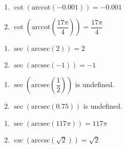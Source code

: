 \begin{multicols}{2}

\begin{enumerate}

\setcounter{enumi}{\value{HW}}

\item $\cot\left(\text{arccot}\left(-0.001\right)\right) = -0.001$ 
\item $\cot\left(\text{arccot}\left( \dfrac{17\pi}{4} \right)\right) = \dfrac{17\pi}{4}$

\setcounter{HW}{\value{enumi}}

\end{enumerate}

\end{multicols}

\begin{multicols}{2}

\begin{enumerate}

\setcounter{enumi}{\value{HW}}

\item $\sec\left(\text{arcsec}\left(2\right)\right) = 2$
\item $\sec\left(\text{arcsec}\left(-1\right)\right) = -1$

\setcounter{HW}{\value{enumi}}

\end{enumerate}

\end{multicols}

\begin{multicols}{2}

\begin{enumerate}

\setcounter{enumi}{\value{HW}}

\item $\sec\left(\text{arcsec}\left(\dfrac{1}{2}\right)\right)$ is undefined.
\item $\sec\left(\text{arcsec}\left(0.75\right)\right)$ is undefined. 

\setcounter{HW}{\value{enumi}}

\end{enumerate}

\end{multicols}

\begin{multicols}{2}

\begin{enumerate}

\setcounter{enumi}{\value{HW}}

\item $\sec\left(\text{arcsec}\left( 117\pi \right)\right)= 117\pi $
\item $\csc\left(\text{arccsc}\left(\sqrt{2}\right)\right) = \sqrt{2}$ 

\setcounter{HW}{\value{enumi}}

\end{enumerate}

\end{multicols}

